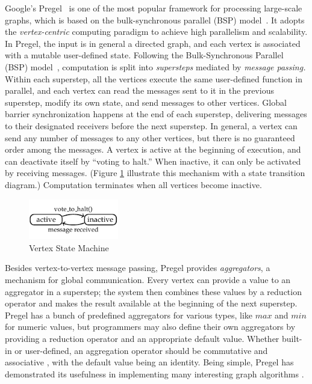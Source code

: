 \documentclass{sokendai_thesis} %
\begin{document}
Google's Pregel~\cite{pregel} is one of the most popular framework for processing large-scale graphs, which is based on the bulk-synchronous parallel (BSP) model~\cite{bsp}.
It adopts the \emph{vertex-centric} computing paradigm to achieve high parallelism and scalability.
In Pregel, the input is in general a directed graph, and each vertex is associated with a mutable user-defined state.
Following the Bulk-Synchronous Parallel (BSP) model~\cite{bsp}, computation is split into \emph{supersteps} mediated by \emph{message passing.}
Within each superstep, all the vertices execute the same user-defined function in parallel, and each vertex can read the messages sent to it in the previous superstep, modify its own state, and send messages to other vertices.
Global barrier synchronization happens at the end of each superstep, delivering messages to their designated receivers before the next superstep.
In general, a vertex can send any number of messages to any other vertices, but there is no guaranteed order among the messages.
A vertex is active at the beginning of execution, and can deactivate itself by ``voting to halt.''
When inactive, it can only be activated by receiving messages.
(Figure \ref{fig:voteToHalt} illustrate this mechanism with a state transition diagram.)
Computation terminates when all vertices become inactive. %
\begin{figure}[ht]
 \centering
 \includegraphics[width=0.35\textwidth]{figures/active.pdf}
 \caption{Vertex State Machine}
 \label{fig:voteToHalt}
\end{figure}

Besides vertex-to-vertex message passing, Pregel provides \emph{aggregators}, a mechanism for global communication.
Every vertex can provide a value to an aggregator in a superstep; the system then combines these values by a reduction operator and makes the result available at the beginning of the next superstep.
Pregel has a bunch of predefined aggregators for various types, like $\mathit{max}$ and $\mathit{min}$ for numeric values, but programmers may also define their own aggregators by providing a reduction operator and an appropriate default value.
Whether built-in or user-defined, an aggregation operator should be commutative and associative , with the default value being an identity.
Being simple, Pregel has demonstrated its usefulness in implementing many interesting graph algorithms \cite{pregel,QuWH12,connectivity,optimizing,XiYZ14}.
\end{document}
